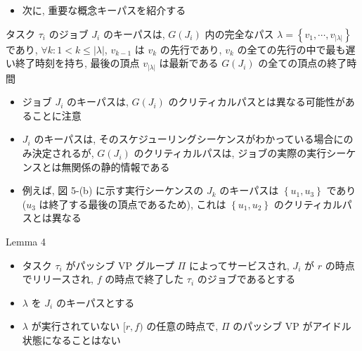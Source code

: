 \begin{frame}{}
    \begin{itemize}
        \item 次に, 重要な概念キーパスを紹介する
    \end{itemize}
\end{frame}

\begin{frame}{}
    \begin{definition}[キーパス]
        タスク $\tau_{i}$ のジョブ $J_{i}$ のキーパスは, $G\left(J_{i}\right)$ 内の完全なパス $\lambda=\left\{v_{1}, \cdots, v_{|\lambda|}\right\}$ であり, $\forall k: 1<k \leq|\lambda|$, $v_{k-1}$ は $v_{k}$ の先行であり, $v_{k}$ の全ての先行の中で最も遅い終了時刻を持ち, 最後の頂点 $v_{|\lambda|}$ は最新である $G\left(J_{i}\right)$ の全ての頂点の終了時間
    \end{definition}
\end{frame}

\begin{frame}{}
    \begin{itemize}
        \item ジョブ $J_{i}$ のキーパスは, $G\left(J_{i}\right)$ のクリティカルパスとは異なる可能性があることに注意
\item $J_{i}$ のキーパスは, そのスケジューリングシーケンスがわかっている場合にのみ決定されるが, $G\left(J_{i}\right)$ のクリティカルパスは, ジョブの実際の実行シーケンスとは無関係の静的情報である
\item 例えば, 図 5-(b) に示す実行シーケンスの $J_{k}$ のキーパスは $\left\{u_{1}, u_{3}\right\}$ であり ($u_{3}$ は終了する最後の頂点であるため), これは $\left\{u_{1}, u_{2}\right\}$ のクリティカルパスとは異なる
    \end{itemize}
\end{frame}

\begin{frame}[label=lemma4]{Lemma 4}
    \begin{lemma}[]
        \begin{itemize}
            \item タスク $\tau_{i}$ がパッシブ VP グループ $\Pi$ によってサービスされ, $J_{i}$ が $r$ の時点でリリースされ, $f$ の時点で終了した $\tau_{i}$ のジョブであるとする
\item $\lambda$ を $J_{i}$ のキーパスとする
\item $\lambda$ が実行されていない $[r, f)$ の任意の時点で, $\Pi$ のパッシブ VP がアイドル状態になることはない
        \end{itemize}
    \end{lemma}
\end{frame}

